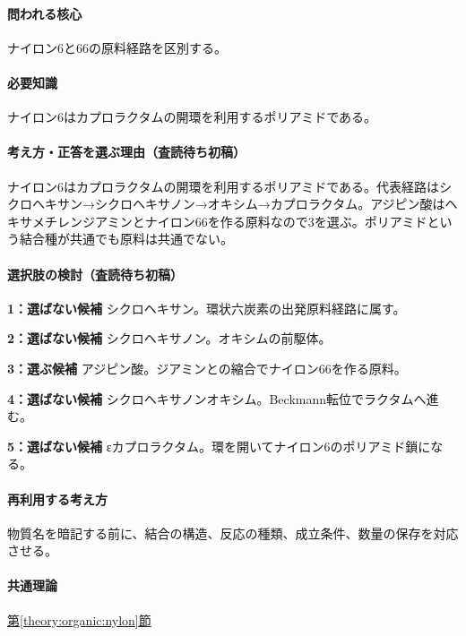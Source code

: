 \paragraph{問われる核心} ナイロン6と66の原料経路を区別する。

\paragraph{必要知識} ナイロン6はカプロラクタムの開環を利用するポリアミドである。

\paragraph{考え方・正答を選ぶ理由（査読待ち初稿）} ナイロン6はカプロラクタムの開環を利用するポリアミドである。代表経路はシクロヘキサン→シクロヘキサノン→オキシム→カプロラクタム。アジピン酸はヘキサメチレンジアミンとナイロン66を作る原料なので3を選ぶ。ポリアミドという結合種が共通でも原料は共通でない。

\paragraph{選択肢の検討（査読待ち初稿）}\mbox{}\par

\noindent\textbf{1：選ばない候補} シクロヘキサン。環状六炭素の出発原料経路に属す。\par

\noindent\textbf{2：選ばない候補} シクロヘキサノン。オキシムの前駆体。\par

\noindent\textbf{3：選ぶ候補} アジピン酸。ジアミンとの縮合でナイロン66を作る原料。\par

\noindent\textbf{4：選ばない候補} シクロヘキサノンオキシム。Beckmann転位でラクタムへ進む。\par

\noindent\textbf{5：選ばない候補} εカプロラクタム。環を開いてナイロン6のポリアミド鎖になる。\par

\paragraph{再利用する考え方} 物質名を暗記する前に、結合の構造、反応の種類、成立条件、数量の保存を対応させる。

\paragraph{共通理論} \hyperref[theory:organic:nylon]{第\ref*{theory:organic:nylon}節}


